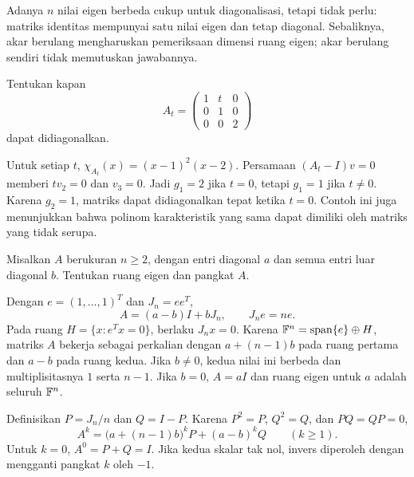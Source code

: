 Adanya $n$ nilai eigen berbeda cukup untuk diagonalisasi, tetapi
tidak perlu: matriks identitas mempunyai satu nilai eigen dan tetap
diagonal. Sebaliknya, akar berulang mengharuskan pemeriksaan dimensi
ruang eigen; akar berulang sendiri tidak memutuskan jawabannya.

\begin{exam}
    Tentukan kapan
    \[
        A_t=\begin{pmatrix}1&t&0\\0&1&0\\0&0&2\end{pmatrix}
    \]
    dapat didiagonalkan.
\end{exam}
\begin{solution}
    Untuk setiap $t$, $\chi_{A_t}(x)=(x-1)^2(x-2)$.
    Persamaan $(A_t-I)v=0$ memberi $tv_2=0$ dan $v_3=0$.
    Jadi $g_1=2$ jika $t=0$, tetapi $g_1=1$ jika $t\ne0$.
    Karena $g_2=1$, matriks dapat didiagonalkan tepat ketika $t=0$.
    Contoh ini juga menunjukkan bahwa polinom karakteristik yang sama
    dapat dimiliki oleh matriks yang tidak serupa.
\end{solution}

\begin{exam}
    Misalkan $A$ berukuran $n\ge2$, dengan entri diagonal $a$ dan
    semua entri luar diagonal $b$. Tentukan ruang eigen dan pangkat $A$.
\end{exam}
\begin{solution}
    Dengan $e=(1,\ldots,1)^T$ dan $J_n=ee^T$,
    \[
        A=(a-b)I+bJ_n,\qquad J_ne=ne.
    \]
    Pada ruang $H=\{x:e^Tx=0\}$, berlaku $J_nx=0$.
    Karena $\mathbb{F}^n=\operatorname{span}\{e\}\oplus H$, matriks $A$
    bekerja sebagai perkalian dengan $a+(n-1)b$ pada ruang pertama
    dan $a-b$ pada ruang kedua. Jika $b\ne0$, kedua nilai ini berbeda
    dan multiplisitasnya $1$ serta $n-1$. Jika $b=0$, $A=aI$ dan
    ruang eigen untuk $a$ adalah seluruh $\mathbb{F}^n$.

    Definisikan $P=J_n/n$ dan $Q=I-P$.
    Karena $P^2=P$, $Q^2=Q$, dan $PQ=QP=0$,
    \[
        A^k=\bigl(a+(n-1)b\bigr)^kP+(a-b)^kQ\qquad(k\ge1).
    \]
    Untuk $k=0$, $A^0=P+Q=I$.
    Jika kedua skalar tak nol, invers diperoleh dengan mengganti
    pangkat $k$ oleh $-1$.
\end{solution}


